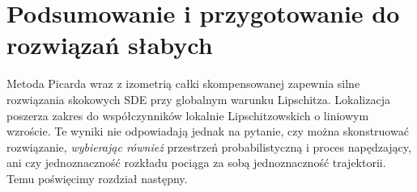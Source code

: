 \section{Podsumowanie i przygotowanie do rozwiązań słabych}
Metoda Picarda wraz z izometrią całki skompensowanej
zapewnia silne rozwiązania skokowych SDE przy globalnym
warunku Lipschitza. Lokalizacja poszerza zakres do
współczynników lokalnie Lipschitzowskich o liniowym
wzroście. Te wyniki nie odpowiadają jednak na pytanie,
czy można skonstruować rozwiązanie, \emph{wybierając również}
przestrzeń probabilistyczną i proces napędzający, ani czy
jednoznaczność rozkładu pociąga za sobą jednoznaczność
trajektorii. Temu poświęcimy rozdział następny.

